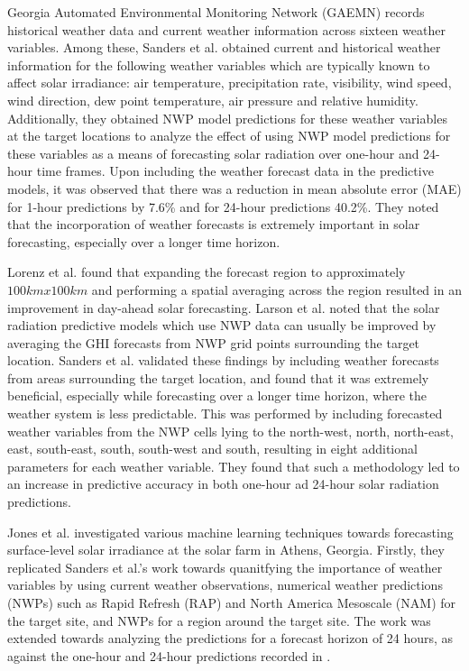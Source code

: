 \par Georgia Automated Environmental Monitoring Network (GAEMN) records historical weather data and current weather information across sixteen weather variables. Among these, Sanders et al. obtained current and historical weather information for the following weather variables which are typically known to affect solar irradiance: air temperature, precipitation rate, visibility, wind speed, wind direction, dew point temperature, air pressure and relative humidity. Additionally, they obtained NWP model predictions for these weather variables at the target locations to analyze the effect of using NWP model predictions for these variables as a means of forecasting solar radiation over one-hour and 24-hour time frames. Upon including the weather forecast data in the predictive models, it was observed that there was a reduction in mean absolute error (MAE) for 1-hour predictions by 7.6\% and for 24-hour predictions 40.2\%. They noted that the incorporation of weather forecasts is extremely important in solar forecasting, especially over a longer time horizon.

\par Lorenz et al. \cite{expansion_lorenz} found that expanding the forecast region to approximately $100km x 100km$ and performing a spatial averaging across the region resulted in an improvement in day-ahead solar forecasting. Larson et al. \cite{pvlib_larson} noted that the solar radiation predictive models which use NWP data can usually be improved by averaging the GHI forecasts from NWP grid points surrounding the target location. Sanders et al. validated these findings by including weather forecasts from areas surrounding the target location, and found that it was extremely beneficial, especially while forecasting over a longer time horizon, where the weather system is less predictable. This was performed by including forecasted weather variables from the NWP cells lying to the north-west, north, north-east, east, south-east, south, south-west and south, resulting in eight additional parameters for each weather variable. They found that such a methodology led to an increase in predictive accuracy in both one-hour ad 24-hour solar radiation predictions.

\par Jones et al. \cite{thesis_zach} investigated various machine learning techniques towards forecasting surface-level solar irradiance at the solar farm in Athens, Georgia. Firstly, they replicated Sanders et al.'s work towards quanitfying the importance of weather variables by using current weather observations, numerical weather predictions (NWPs) such as Rapid Refresh (RAP) and North America Mesoscale (NAM) for the target site, and NWPs for a region around the target site. The work was extended towards analyzing the predictions for a forecast horizon of 24 hours, as against the one-hour and 24-hour predictions recorded in \cite{publication_sanders}. 

